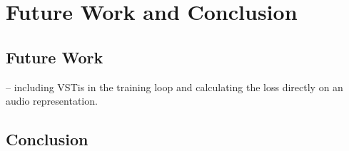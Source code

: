 \chapter{Future Work and Conclusion}

\section{Future Work}
\cite{ramirez2021differentiable} -- including VSTis in the training loop and calculating the loss directly on an audio representation.

\section{Conclusion}